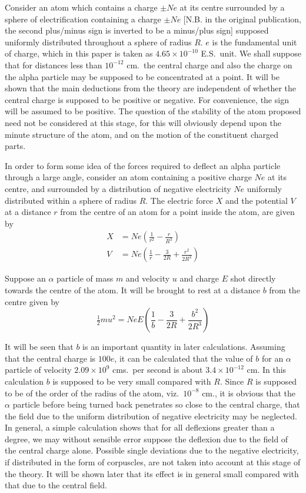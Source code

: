 \documentclass[12pt]{article}
\begin{document}
\bigskip
Consider an atom which contains a charge $\pm Ne$ at its centre surrounded by a sphere of electrification containing
a charge $\pm Ne$
[N.B. in the original publication, the second plus/minus sign is inverted to be a minus/plus sign]
supposed uniformly distributed throughout a sphere of radius $R$.
$e$ is the fundamental unit of charge, which in this paper is taken as $4.65\times10^{-10}$ E.S.~unit.
We shall suppose that for distances less than $10^{-12}$ cm.~the central charge and also the charge on the alpha
particle may be supposed to be concentrated at a point.
It will be shown that the main deductions from the theory are independent of whether the central charge is supposed to be positive or negative.
For convenience, the sign will be assumed to be positive.
The question of the stability of the atom proposed need not be considered at this stage,
for this will obviously depend upon the minute structure of the atom,
and on the motion of the constituent charged parts.

\bigskip
In order to form some idea of the forces required to deflect an alpha particle through a large angle,
consider an atom containing a positive charge $Ne$ at its centre, and surrounded by a distribution of negative
electricity $Ne$ uniformly distributed within a sphere of radius $R$.
The electric force $X$ and the potential $V$ at a distance $r$ from the centre of an atom for a point inside the atom,
are given by
\begin{align*}
X&=Ne\left(\frac{1}{r^2}-\frac{r}{R^3}\right)
\\
V&=Ne\left(\frac{1}{r}-\frac{3}{2R}+\frac{r^2}{2R^3}\right)
\end{align*}

Suppose an $\alpha$ particle of mass $m$ and velocity $u$ and charge $E$ shot directly towards the centre of the atom.
It will be brought to rest at a distance $b$ from the centre given by
\begin{equation*}
\tfrac{1}{2}mu^2=NeE\left(\frac{1}{b}-\frac{3}{2R}+\frac{b^2}{2R^3}\right)
\end{equation*}

It will be seen that $b$ is an important quantity in later calculations.
Assuming that the central charge is $100e$, it can be calculated that the value of $b$ for an $\alpha$
particle of velocity $2.09\times10^9$ cms.~per second is about
$3.4\times10^{-12}$ cm.
In this calculation $b$ is supposed to be very small compared with $R$.
Since $R$ is supposed to be of the order of the radius of the atom, viz.~$10^{-8}$ cm.,
it is obvious that the $\alpha$ particle before being turned back penetrates so close to
the central charge, that the field due to the uniform distribution of negative electricity may be neglected.
In general, a simple calculation shows that for all deflexions greater than a degree,
we may without sensible error suppose the deflexion due to the field of the central charge alone.
Possible single deviations due to the negative electricity,
if distributed in the form of corpuscles, are not taken into account at this stage of the theory.
It will be shown later that its effect is in general small compared with that due to the central field.
\end{document}
